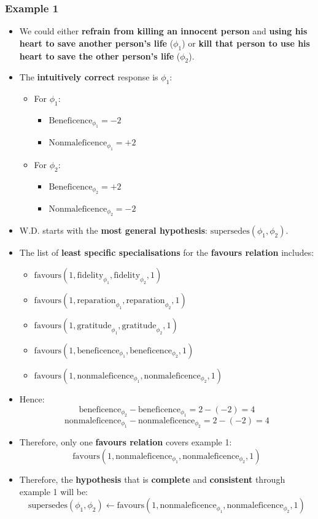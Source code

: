 \documentclass[11pt]{article}
\begin{document}
 \newpage
\subsubsection{Example 1}
\label{sec:orgdff4f28}
\begin{itemize}
\item We could either \textbf{refrain from killing an innocent person} and \textbf{using his heart to save another person's life} (\(\phi_1\)) or \textbf{kill that person to use his heart to save the other person's life} (\(\phi_2\)).
\item The \textbf{intuitively correct} response is \(\phi_1\):
\begin{itemize}
\item For \(\phi_1\):
\begin{itemize}
\item \(\text{Beneficence}_{\phi_1} = - 2\)
\item \(\text{Nonmaleficence}_{\phi_1} = + 2\)
\end{itemize}
\item For \(\phi_2\):
\begin{itemize}
\item \(\text{Beneficence}_{\phi_2} = + 2\)
\item \(\text{Nonmaleficence}_{\phi_2} = - 2\)
\end{itemize}
\end{itemize}
\item W.D. starts with the \textbf{most general hypothesis}: \(\text{supersedes}(\phi_1, \phi_2)\).
\item The list of \textbf{least specific specialisations} for the \textbf{favours relation} includes:
\begin{itemize}
\item \(\text{favours}(1, \text{fidelity}_{\phi_1}, \text{fidelity}_{\phi_2}, 1)\)
\item \(\text{favours}(1, \text{reparation}_{\phi_1}, \text{reparation}_{\phi_2}, 1)\)
\item \(\text{favours}(1, \text{gratitude}_{\phi_1}, \text{gratitude}_{\phi_2}, 1)\)
\item \(\text{favours}(1, \text{beneficence}_{\phi_1}, \text{beneficence}_{\phi_2}, 1)\)
\item \(\text{favours}(1, \text{nonmaleficence}_{\phi_1}, \text{nonmaleficence}_{\phi_2}, 1)\)
\end{itemize}
\item Hence:
\[\text{beneficence}_{\phi_2} - \text{beneficence}_{\phi_1} = 2 - (-2) = 4\]
\[\text{nonmaleficence}_{\phi_1} - \text{nonmaleficence}_{\phi_2} = 2 - (-2) = 4\]
\item Therefore, only one \textbf{favours relation} covers example 1:
\[\text{favours}(1, \text{nonmaleficence}_{\phi_1}, \text{nonmaleficence}_{\phi_2}, 1)\]
\item Therefore, the \textbf{hypothesis} that is \textbf{complete} and \textbf{consistent} through example 1 will be:
\[\text{supersedes}(\phi_1, \phi_2) \leftarrow \text{favours}(1, \text{nonmaleficence}_{\phi_1}, \text{nonmaleficence}_{\phi_2}, 1)\]
\end{itemize}
\end{document}
